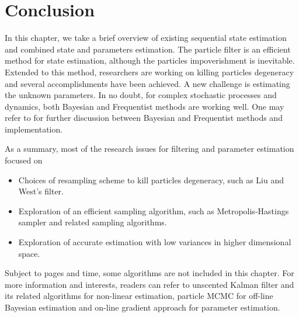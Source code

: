 \section{Conclusion}

In this chapter, we take a brief overview of existing sequential state estimation and combined state and parameters estimation. The particle filter is an efficient method for state estimation, although the particles impoverishment is inevitable. Extended to this method, researchers are working on killing particles degeneracy and several accomplishments have been achieved. A new challenge is estimating the unknown parameters. In no doubt, for complex stochastic processes and dynamics, both Bayesian and Frequentist methods are working well. One may refer to \cite{wakefield2013bayesian} for further discussion between Bayesian and Frequentist methods and implementation. 

As a summary, most of the research issues for filtering and parameter estimation focused on 
\begin{itemize}
\item Choices of resampling scheme to kill particles degeneracy, such as Liu and West's filter.
\item Exploration of an efficient sampling algorithm, such as Metropolis-Hastings sampler and related sampling algorithms. 
\item Exploration of accurate estimation with low variances in higher dimensional space. 
\end{itemize}

Subject to pages and time, some algorithms are not included in this chapter. For more information and interests, readers can refer to unscented Kalman filter \cite{wan2000unscented} and its related algorithms for non-linear estimation, particle MCMC \cite{andrieu2010particle} for off-line Bayesian estimation and on-line gradient approach \cite{poyiadjis2005maximum} for parameter estimation. 



